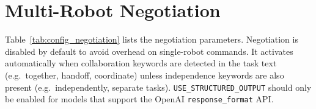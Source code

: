 \begin{table}[t]
	\centering
	\caption{AutoRT configuration parameters.}
	\label{tab:config_autort}
\end{table}

\section{Multi-Robot Negotiation}\label{appendix:config:negotiation}
Table~\ref{tab:config_negotiation} lists the negotiation parameters. Negotiation is disabled by default to avoid overhead on single-robot commands. It activates automatically when collaboration keywords are detected in the task text (e.g.\ together, handoff, coordinate) unless independence keywords are also present (e.g.\ independently, separate tasks). \texttt{USE\_STRUCTURED\_OUTPUT} should only be enabled for models that support the OpenAI \texttt{response\_format} API.

